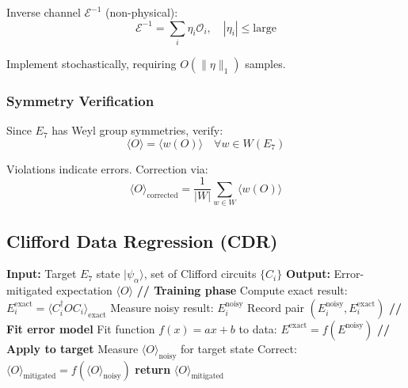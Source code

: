 Inverse channel $\mathcal{E}^{-1}$ (non-physical):
\begin{equation}
\mathcal{E}^{-1} = \sum_i \eta_i \mathcal{O}_i, \quad |\eta_i| \le \text{large}
\end{equation}

Implement stochastically, requiring $O(\|\eta\|_1)$ samples.

\subsubsection{Symmetry Verification}

\begin{proposition}
\label{prop:weyl_error_detection}
Since $E_7$ has Weyl group symmetries, verify:
\begin{equation}
\langle O \rangle = \langle w(O) \rangle \quad \forall w \in W(E_7)
\end{equation}

Violations indicate errors. Correction via:
\begin{equation}
\langle O \rangle_{\text{corrected}} = \frac{1}{|W|} \sum_{w \in W} \langle w(O) \rangle
\end{equation}
\end{proposition}

\subsection{Clifford Data Regression (CDR)}

\begin{algorithm}[H]
\caption{CDR for $E_7$ State Preparation}
\label{alg:cdr_e7}
\begin{algorithmic}[1]
\State \textbf{Input:} Target $E_7$ state $|\psi_{\alpha}\rangle$, set of Clifford circuits $\{C_i\}$
\State \textbf{Output:} Error-mitigated expectation $\langle O \rangle$
\State
\State \textbf{// Training phase}
    \State Compute exact result: $E_i^{\text{exact}} = \langle C_i^\dagger O C_i \rangle_{\text{exact}}$
    \State Measure noisy result: $E_i^{\text{noisy}}$
    \State Record pair $(E_i^{\text{noisy}}, E_i^{\text{exact}})$
\EndFor
\State
\State \textbf{// Fit error model}
\State Fit function $f(x) = ax + b$ to data: $E^{\text{exact}} = f(E^{\text{noisy}})$
\State
\State \textbf{// Apply to target}
\State Measure $\langle O \rangle_{\text{noisy}}$ for target state
\State Correct: $\langle O \rangle_{\text{mitigated}} = f(\langle O \rangle_{\text{noisy}})$
\State
\State \textbf{return} $\langle O \rangle_{\text{mitigated}}$
\end{algorithmic}
\end{algorithm}

